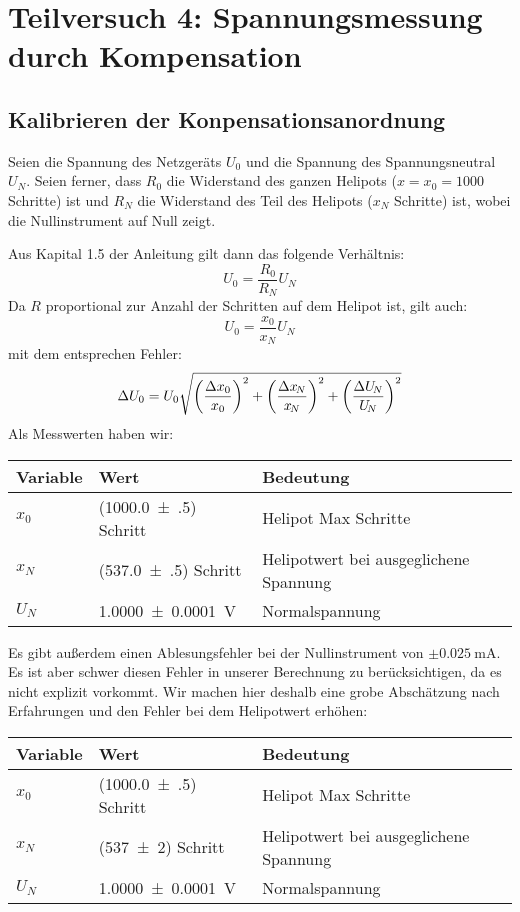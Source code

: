 \newpage
\section{Teilversuch 4: Spannungsmessung durch Kompensation}
	\subsection{Kalibrieren der Konpensationsanordnung}
		Seien die Spannung des Netzgeräts $U_0$ und die Spannung des Spannungsneutral $U_N$. Seien ferner, dass $R_0$ die Widerstand des ganzen Helipots ($x = x_0 = 1000$ Schritte) ist und $R_N$ die Widerstand des Teil des Helipots ($x_{\!N}$ Schritte) ist, wobei die Nullinstrument auf Null zeigt.

		Aus Kapital 1.5 der Anleitung gilt dann das folgende Verhältnis:
		\begin{equation}
			U_0 = \frac{R_0}{R_N} U_{\!N}
		\end{equation}
		Da $R$ proportional zur Anzahl der Schritten auf dem Helipot ist, gilt auch:
		\begin{equation}
			U_0 = \frac{x_0}{x_{\!N}}U_{\!N} \label{eqn:kalibierung}
		\end{equation}
		mit dem entsprechen Fehler:
		\begin{align}
			\Delta U_0 = U_0 \relquad{x_0, x_{\!N}, U_{\!N}} 
		\end{align}
		Als Messwerten haben wir:
		\begin{center}
			\begin{tabular}{lll}
				\toprule
				Variable & Wert & Bedeutung \\
				\midrule
				$x_0$ & (\num{1000.0(5)}) Schritt & Helipot Max Schritte \\
				$x_{\!N}$ & (\num{537.0(5)}) Schritt & Helipotwert bei ausgeglichene Spannung  \\
				$U_{\!N}$ & \SI{1.0000(1)}{\volt} & Normalspannung  \\
				\bottomrule
			\end{tabular}
		\end{center}
		Es gibt außerdem einen Ablesungsfehler bei der Nullinstrument von $\pm \SI{0.025}{\milli\ampere}$. Es ist aber schwer diesen Fehler in unserer Berechnung zu berücksichtigen, da es nicht explizit vorkommt. Wir machen hier deshalb eine grobe Abschätzung nach Erfahrungen und den Fehler bei dem Helipotwert erhöhen:
		\begin{center}
			\begin{tabular}{lll}
				\toprule
				Variable & Wert & Bedeutung \\
				\midrule
				$x_0$ & (\num{1000.0(5)}) Schritt & Helipot Max Schritte \\
				$x_{\!N}$ & (\num{537(2)}) Schritt & Helipotwert bei ausgeglichene Spannung  \\
				$U_{\!N}$ & \SI{1.0000(1)}{\volt} & Normalspannung  \\
				\bottomrule
			\end{tabular}
		\end{center}
